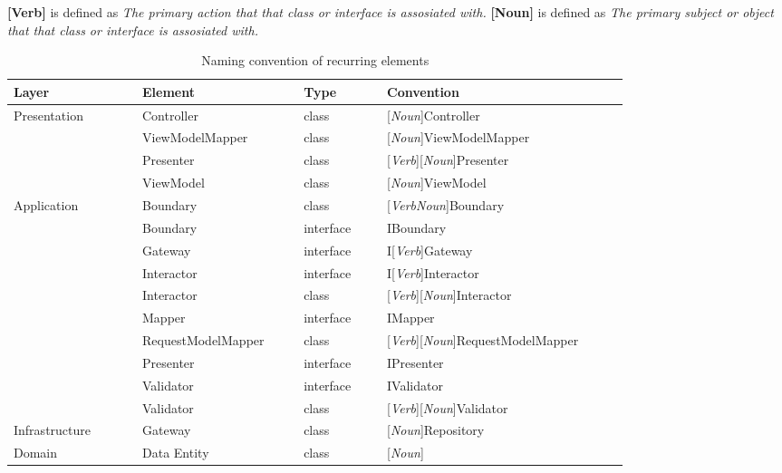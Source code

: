\textbf{[Verb]} is defined as \textit{The primary action that that class or interface is assosiated with.} \newline 
\textbf{[Noun]} is defined as \textit{The primary subject or object that that class or interface is assosiated with.} 

\begin{table}[ht]
  \renewcommand{\arraystretch}{1.5}
  \footnotesize
  \caption{Naming convention of recurring elements}
  \begin{tabular}{ p{0.17\linewidth} p{0.19\linewidth} p{0.11\linewidth} p{0.32\linewidth} }
  \hline
  \textbf{Layer} & \textbf{Element} & \textbf{Type} & \textbf{Convention} \\ \hline
  Presentation & Controller & class & [\textit{Noun}]Controller \\
  & ViewModel\-Mapper & class & [\textit{Noun}]ViewModel\-Mapper \\
  & Presenter & class & [\textit{Verb}][\textit{Noun}]Presenter \\
  & ViewModel & class & [\textit{Noun}]ViewModel \\

  Application & Boundary & class & [\textit{VerbNoun}]Boundary \\
  & Boundary  & interface & IBoundary \\
  & Gateway  & interface & I[\textit{Verb}]Gateway \\
  & Interactor  & interface & I[\textit{Verb}]Interactor \\
  & Interactor & class & [\textit{Verb}][\textit{Noun}]Interactor \\
  & Mapper  & interface & IMapper \\
  & Request\-ModelMapper & class & [\textit{Verb}][\textit{Noun}]Request\-ModelMapper \\
  & Presenter  & interface & IPresenter \\
  & Validator  & interface & IValidator \\
  & Validator & class & [\textit{Verb}][\textit{Noun}]Validator \\
  
  Infrastructure & Gateway & class & [\textit{Noun}]Repository \\

  Domain & Data Entity & class & [\textit{Noun}] \\ \hline

  \end{tabular}
  
  \label{table_element_naming_convention}
\end{table}
